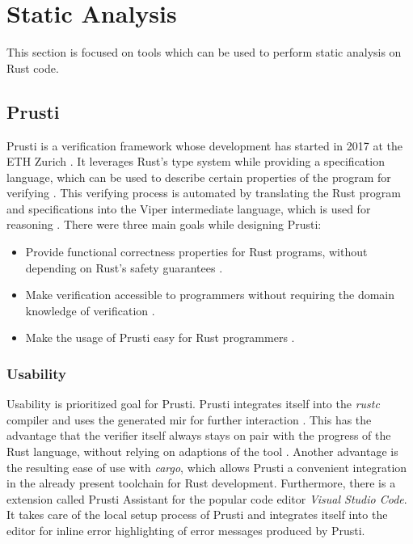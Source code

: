 \section{Static Analysis}

This section is focused on tools which can be used to perform static analysis on Rust code.

\subsection{Prusti}

Prusti is a verification framework whose development has started in 2017 at the ETH Zurich \cite{astrauskas_leveraging_2019,deshmukh_prusti_2022}. It leverages Rust's type system while providing a specification language, which can be used to describe certain properties of the program for verifying \cite{astrauskas_leveraging_2019}. This verifying process is automated by translating the Rust program and specifications into the Viper \cite{jobstmann_viper_2016} intermediate language, which is used for reasoning \cite{astrauskas_leveraging_2019}. There were three main goals while designing Prusti:

\begin{itemize}
    \item Provide functional correctness properties for Rust programs, without depending on Rust's safety guarantees \cite{deshmukh_prusti_2022}.
    \item Make verification accessible to programmers without requiring the domain knowledge of verification \cite{deshmukh_prusti_2022}.
    \item Make the usage of Prusti easy for Rust programmers \cite{deshmukh_prusti_2022}.
\end{itemize}

\subsubsection{Usability}

Usability is prioritized goal for Prusti.
Prusti integrates itself into the \textit{rustc} compiler and uses the generated \acs{mir} for further interaction \cite{deshmukh_prusti_2022}. This has the advantage that the verifier itself always stays on pair with the progress of the Rust language, without relying on adaptions of the tool \cite{deshmukh_prusti_2022}. Another advantage is the resulting ease of use with \textit{cargo}, which allows Prusti a convenient integration in the already present toolchain for Rust development. Furthermore, there is a extension called Prusti Assistant \cite{chair_of_programming_methodology_-_eth_zurich_prusti_nodate} for the popular code editor \textit{Visual Studio Code}. It takes care of the local setup process of Prusti and integrates itself into the editor for inline error highlighting of error messages produced by Prusti.

